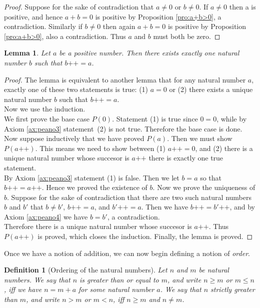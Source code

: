 \documentclass[a4paper]{book}
\newtheorem*{proof}{\textit{Proof.}}
\theoremstyle{break}
\newtheorem{definition}{Definition}[section]
\newtheorem{lemma}{Lemma}[section]
\begin{document}
			\begin{proof}
				Suppose for the sake of contradiction that $a \neq 0$ or $b \neq 0$. If $a \neq 0$ then a is positive, and hence $a+b=0$ is positive by Proposition \ref{pro:a+b>0}, a contradiction. Similarly if $b \neq 0$ then again $a+b=0$ is positive by Proposition \ref{pro:a+b>0}, also a contradiction. Thus $a$ and $b$ must both be zero. 
			\end{proof}
			\begin{lemma}
				\label{lem:b++=a}
				Let $a$ be a positive number. Then there exists exactly one natural number $b$ such that $b\texttt{++}=a$.
			\end{lemma}
			\begin{proof}
				The lemma is equivalent to another lemma that for any natural number $a$, exactly one of these two statements is true: (1) $a=0$ or (2) there exists a unique natural number $b$ such that $b\texttt{++}=a$.\\
				Now we use the induction.\\
				We first prove the base case $P(0)$. Statement (1) is true since $0=0$, while by Axiom \ref{ax:peano3} statement~(2) is not true. Therefore the base case is done.\\
				Now suppose inductively that we have proved $P(a)$. Then we must show $P(a\texttt{++})$. This means we need to show between (1) $a\texttt{++}=0$, and (2) there is a unique natural number whose succesor is $a\texttt{++}$ there is exactly one true statement.\\
				By Axiom \ref{ax:peano3} statement (1) is false. Then we let $b=a$ so that $b\texttt{++}=a\texttt{++}$. Hence we proved the existence of $b$. Now we prove the uniqueness of $b$. Suppose for the sake of contradiction that there are two such natural numbers $b$ and $b'$ that $b \neq b'$, $b\texttt{++}=a$, and $b'\texttt{++}=a$. Then we have $b\texttt{++}=b'\texttt{++}$, and by Axiom \ref{ax:peano4} we have $b=b'$, a contradiction.
				\\Therefore there is a unique natural number whose succesor is $a\texttt{++}$. Thus $P(a\texttt{++})$ is proved, which closes the induction. Finally, the lemma is proved.
			\end{proof}
			Once we have a notion of addition, we can now begin defining a notion of \textit{order}.
			\begin{definition}[Ordering of the natural numbers]
				\label{def:order of natural numbers}
				Let $n$ and $m$ be natural numbers. We say that $n$ is greater than or equal to $m$, and write $n \geq m$ or $m \leq n$, iff we have $n=m+a$ for some natural number $a$. We say that $n$ strictly greater than $m$, and write $n>m$ or $m<n$, iff $n \geq m$ and $n\neq m$.
			\end{definition}
\end{document}
